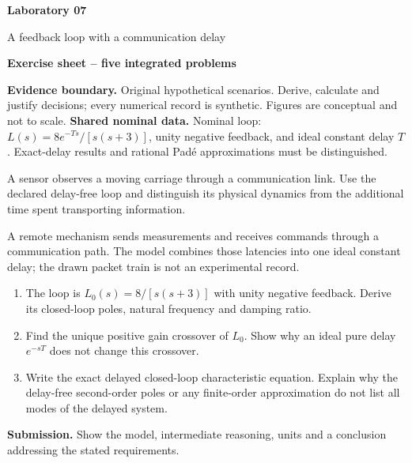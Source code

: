 \documentclass[10pt,a4paper]{article}
\newcommand{\task}[2]{\par\medskip{\color{ink}\Large\bfseries #1. #2}\par\smallskip}
\begin{document}
{\color{ink}\LARGE\bfseries Laboratory 07}\par
{\large A feedback loop with a communication delay}\par
\textbf{Exercise sheet -- five integrated problems}\par
{\small\textbf{Evidence boundary.} Original hypothetical scenarios. Derive, calculate and justify decisions; every numerical record is synthetic. Figures are conceptual and not to scale.}
\smallskip\textbf{Shared nominal data.} Nominal loop: $L(s)=8e^{-Ts}/[s(s+3)]$, unity negative feedback, and ideal constant delay $T$. Exact-delay results and rational Pad\'e approximations must be distinguished.
\task{1}{A remotely observed actuator}
A sensor observes a moving carriage through a communication link. Use the declared delay-free loop and distinguish its physical dynamics from the additional time spent transporting information.
\begin{center}\resizebox{.88\linewidth}{!}{}\par{\small A remote mechanism sends measurements and receives commands through a communication path. The model combines those latencies into one ideal constant delay; the drawn packet train is not an experimental record.}\end{center}
\begin{enumerate}
\item The loop is $L_0(s)=8/[s(s+3)]$ with unity negative feedback. Derive its closed-loop poles, natural frequency and damping ratio.
\item Find the unique positive gain crossover of $L_0$. Show why an ideal pure delay $e^{-sT}$ does not change this crossover.
\item Write the exact delayed closed-loop characteristic equation. Explain why the delay-free second-order poles or any finite-order approximation do not list all modes of the delayed system.
\end{enumerate}
\vfill{\small\textbf{Submission.} Show the model, intermediate reasoning, units and a conclusion addressing the stated requirements.}
\end{document}
